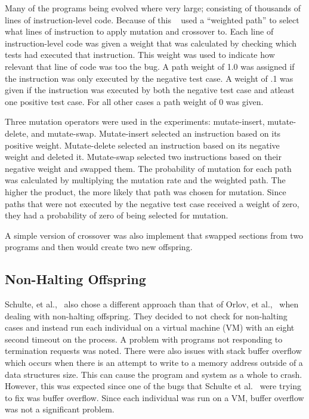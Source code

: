 \documentclass{sig-alternate}
\begin{document}
Many of the programs being evolved where very large; consisting of thousands of lines of instruction-level code. Because of this ~\cite{Assembly:2010} used a ``weighted path'' to select what lines of instruction to apply mutation and crossover to. Each line of instruction-level code was given a weight that was calculated by checking which tests had executed that instruction. This weight was used to indicate how relevant that line of code was too the bug. A path weight of 1.0 was assigned if the instruction was only executed by the negative test case. A weight of .1 was given if the instruction was executed by both the negative test case and atleast one positive test case. For all other cases a path weight of 0 was given.

Three mutation operators were used in the experiments: mutate-insert, mutate-delete, and mutate-swap. Mutate-insert selected an instruction based on its positive weight. Mutate-delete selected an instruction based on its negative weight and deleted it. Mutate-swap selected two instructions based on their negative weight and swapped them. The probability of mutation for each path was calculated by multiplying the mutation rate and the weighted path. The higher the product, the more likely that path was chosen for mutation. Since paths that were not executed by the negative test case received a weight of zero, they had a probability of zero of being selected for mutation.\par

A simple version of crossover was also implement that swapped sections from two programs and then would create two new offspring.

\subsection{Non-Halting Offspring}

Schulte, et al.,~\cite{Assembly:2010} also chose a different approach than that of Orlov, et al.,~\cite{FINCH:2011} when dealing with non-halting offspring. They decided to not check for non-halting cases and instead run each individual on a virtual machine (VM) with an eight second timeout on the process. A problem with programs not responding to termination requests was noted. There were also issues with stack buffer overflow which occurs when there is an attempt to write to a memory address outside of a data structures size. This can cause the program and system as a whole to crash. However, this was expected since one of the bugs that Schulte et al.~\cite{Assembly:2010} were trying to fix was buffer overflow. Since each individual was run on a VM, buffer overflow was not a significant problem.
\end{document}
